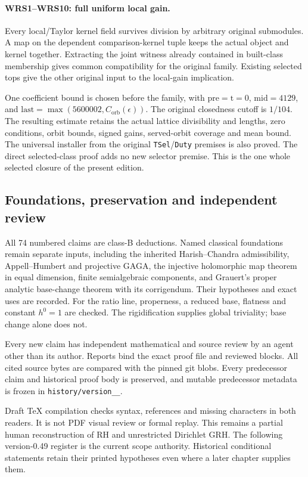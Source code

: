 \paragraph{WRS1--WRS10: full uniform local gain.}
Every local/Taylor kernel field survives division by arbitrary
original submodules. A map on the dependent comparison-kernel tuple
keeps the actual object and kernel together. Extracting the joint
witness already contained in built-class membership gives common
compatibility for the original family. Existing selected tops give
the other original input to the local-gain implication.

One coefficient bound is chosen before the family, with
\(\mathrm{pre}=\mathrm{t}=0\), \(\mathrm{mid}=4129\), and
\(\mathrm{last}=\max(5600002,C_{\mathrm{orb}}(\epsilon))\).
The original closedness cutoff is \(1/104\). The resulting estimate
retains the actual lattice divisibility and lengths, zero conditions,
orbit bounds, signed gains, served-orbit coverage and mean bound.
The universal installer from the original \texttt{TSel}/\texttt{Duty}
premises is also proved. The direct selected-class proof adds no
new selector premise. This is the one whole selected closure of
the present edition.

\subsection{Foundations, preservation and independent review}

All 74 numbered claims are class-B deductions. Named classical
foundations remain separate inputs, including the inherited
Harish--Chandra admissibility, Appell--Humbert and projective GAGA,
the injective holomorphic map theorem in equal dimension, finite
semialgebraic components, and Grauert's proper analytic base-change
theorem with its corrigendum. Their hypotheses and exact uses are
recorded. For the ratio line, properness, a reduced base, flatness
and constant \(h^0=1\) are checked. The rigidification supplies
global triviality; base change alone does not.

Every new claim has independent mathematical and source review by
an agent other than its author. Reports bind the exact proof file
and reviewed blocks. All cited source bytes are compared with the
pinned git blobs. Every predecessor claim and historical proof body
is preserved, and mutable predecessor metadata is frozen in
\texttt{history/\allowbreak version\_\_}.

Draft TeX compilation checks syntax, references and missing characters
in both readers. It is not PDF visual review or formal replay.
This remains a partial human reconstruction of RH and unrestricted
Dirichlet GRH. The following version-0.49 register is the current
scope authority. Historical conditional statements retain their
printed hypotheses even where a later chapter supplies them.

